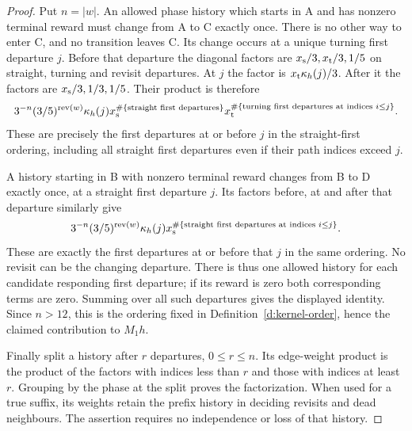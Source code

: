 \begin{proof}
Put \(n=|w|\). An allowed phase history which starts in A and
has nonzero terminal reward must change from A to C exactly once.
There is no other way to enter C, and no transition leaves C.
Its change occurs at a unique turning first departure \(j\).
Before that departure the diagonal factors are
\(x_{\rm s}/3,x_{\rm t}/3,1/5\) on straight, turning and revisit
departures. At \(j\) the factor is
\(x_{\rm t}\kappa_h(j)/3\). After it the factors are
\(x_{\rm s}/3,1/3,1/5\). Their product is therefore
\[
 3^{-n}(3/5)^{\operatorname{rev}(w)}\kappa_h(j)
 x_{\rm s}^{\#\{\text{straight first departures}\}}
 x_{\rm t}^{\#\{\text{turning first departures at indices }i\le j\}}.
\]
These are precisely the first departures at or before \(j\) in
the straight-first ordering, including all straight first departures
even if their path indices exceed \(j\).

A history starting in B with nonzero terminal reward changes from
B to D exactly once, at a straight first departure \(j\). Its
factors before, at and after that departure similarly give
\[
 3^{-n}(3/5)^{\operatorname{rev}(w)}\kappa_h(j)
 x_{\rm s}^{\#\{\text{straight first departures at indices }i\le j\}}.
\]
These are exactly the first departures at or before that \(j\) in
the same ordering. No revisit can be the changing departure.
There is thus one allowed history for each candidate responding
first departure; if its reward is zero both corresponding terms
are zero. Summing over all such departures gives the displayed
identity. Since \(n>12\), this is the ordering fixed in
Definition~\ref{d:kernel-order}, hence the claimed contribution
to \(M_1h\).

Finally split a history after \(r\) departures, \(0\le r\le n\).
Its edge-weight product is the product of the factors with indices
less than \(r\) and those with indices at least \(r\).
Grouping by the phase at the split proves the factorization.
When used for a true suffix, its weights retain the prefix history
in deciding revisits and dead neighbours. The assertion requires
no independence or loss of that history.
\end{proof}

